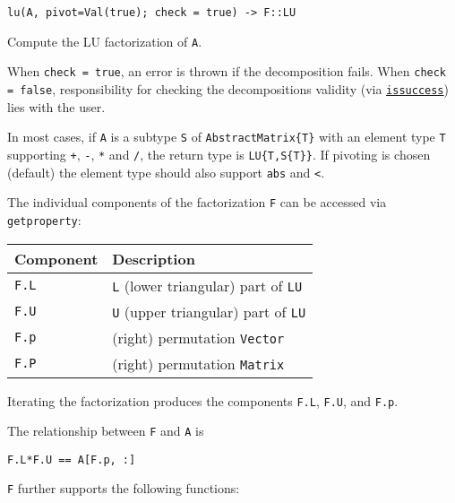 \begin{adjustwidth}{2em}{0pt}


\begin{verbatim}
lu(A, pivot=Val(true); check = true) -> F::LU
\end{verbatim}

Compute the LU factorization of \texttt{A}.

When \texttt{check = true}, an error is thrown if the decomposition fails. When \texttt{check = false}, responsibility for checking the decomposition{\textquotesingle}s validity (via \hyperlink{10694198281534172656}{\texttt{issuccess}}) lies with the user.

In most cases, if \texttt{A} is a subtype \texttt{S} of \texttt{AbstractMatrix\{T\}} with an element type \texttt{T} supporting \texttt{+}, \texttt{-}, \texttt{*} and \texttt{/}, the return type is \texttt{LU\{T,S\{T\}\}}. If pivoting is chosen (default) the element type should also support \texttt{abs} and \texttt{<}.

The individual components of the factorization \texttt{F} can be accessed via \texttt{getproperty}:


\begin{table}[h]

\begin{tabulary}{\linewidth}{|L|L|}
\hline
Component & Description \\
\hline
\texttt{F.L} & \texttt{L} (lower triangular) part of \texttt{LU} \\
\hline
\texttt{F.U} & \texttt{U} (upper triangular) part of \texttt{LU} \\
\hline
\texttt{F.p} & (right) permutation \texttt{Vector} \\
\hline
\texttt{F.P} & (right) permutation \texttt{Matrix} \\
\hline
\end{tabulary}

\end{table}

Iterating the factorization produces the components \texttt{F.L}, \texttt{F.U}, and \texttt{F.p}.

The relationship between \texttt{F} and \texttt{A} is

\texttt{F.L*F.U == A[F.p, :]}

\texttt{F} further supports the following functions:


\begin{table}[h]


\end{table}
\end{adjustwidth}
